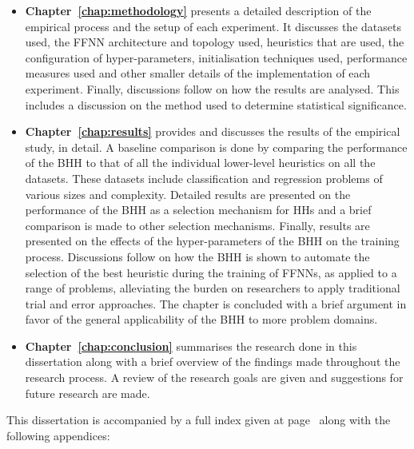 \begin{itemize}
      \item
            \textbf{Chapter~\ref{chap:methodology}} presents a detailed description of
            the empirical process and the setup of each experiment. It discusses the
            datasets used, the \ac{FFNN} architecture and topology used, heuristics that
            are used, the configuration of hyper-parameters, initialisation techniques
            used, performance measures used and other smaller details of the
            implementation of each experiment.  Finally, discussions follow on how the
            results are analysed. This includes a discussion on the method used to
            determine statistical significance.

      \item
            \textbf{Chapter~\ref{chap:results}} provides and discusses the results of
            the empirical study, in detail. A baseline comparison is done by comparing
            the performance of the \Ac{BHH} to that of all the individual lower-level
            heuristics on all the datasets. These datasets include classification and
            regression problems of various sizes and complexity.  Detailed results are
            presented on the performance of the \Ac{BHH} as a selection mechanism for
            \acp{HH} and a brief comparison is made to other selection mechanisms.
            Finally, results are presented on the effects of the hyper-parameters of the
            \Ac{BHH} on the training process. Discussions follow on how the \Ac{BHH} is
            shown to automate the selection of the best heuristic during the training of
            \acp{FFNN}, as applied to a range of problems, alleviating the burden on
            researchers to apply traditional trial and error approaches. The chapter is
            concluded with a brief argument in favor of the general applicability of the
            \Ac{BHH} to more problem domains.

      \item
            \textbf{Chapter~\ref{chap:conclusion}} summarises the research done in this
            dissertation along with a brief overview of the findings made throughout the research
            process. A review of the research goals are given and suggestions for future
            research are made.
\end{itemize}

This dissertation is accompanied by a full index given at page~\pageref{index} along with the following appendices:

